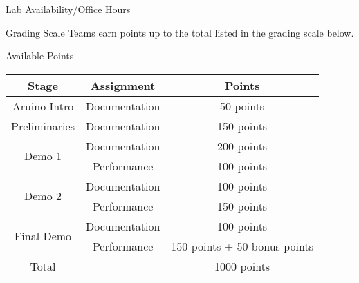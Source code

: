 \begin{frame}{Lab Availability/Office Hours}
\begin{calendar}{\hsize}



\day{}{ %
\\
} 


 
\finishCalendar
\end{calendar}

\end{frame}

\begin{frame}{Grading Scale}
Teams earn points up to the total listed in the grading scale below.
\begin{center}
\begin{block}{Available Points}
\begin{tabular}[t]{ccc}
Stage & Assignment & Points \\\hline
Aruino Intro & Documentation & 50 points \\\hline
Preliminaries & Documentation & 150 points \\\hline
\multirow{2}{*}{Demo 1}  & Documentation &200 points \\
& Performance & 100 points \\\hline
\multirow{2}{*}{Demo 2} & Documentation & 100 points \\
& Performance  & 150 points \\\hline
\multirow{2}{*}{Final Demo} & Documentation & 100 points \\
& Performance  & 150 points + 50 bonus points \\\hline
Total &  &  1000 points \\
\end{tabular}
\end{block}
\end{center}
\end{frame}


